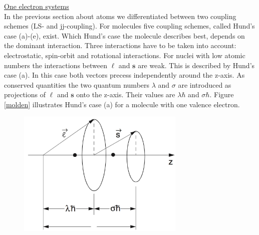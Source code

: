 \documentclass[parskip,12pt,headsepline,a4paper] {scrbook}
\begin{document}
\underline{One electron systems} \\
In the previous section about atoms we differentiated between two coupling schemes (LS- and jj-coupling). For molecules five coupling schemes, called Hund's case (a)-(e), exist. Which Hund's case the molecule describes best, depends on the dominant interaction. Three interactions have to be taken into account: electrostatic, spin-orbit and rotational interactions.
For nuclei with low atomic numbers the interactions between $\boldsymbol{\ell}$ and $\mathbf{s}$ are weak. This is described by Hund's case (a). In this case both vectors precess independently around the z-axis. As conserved quantities the two quantum numbers $\lambda$ and $\sigma$ are introduced as projections of $\boldsymbol{\ell}$ and $\mathbf{s}$ onto the z-axis. Their values are $\lambda \hbar$ and $\sigma \hbar$. Figure \ref{molden} illustrates Hund's case (a) for a molecule with one valence electron.

\begin{figure}[ht]
\centerline{
\includegraphics[width=8cm]{./spectroscopy/ls-mol.jpg}}
\end{figure}
\end{document}
